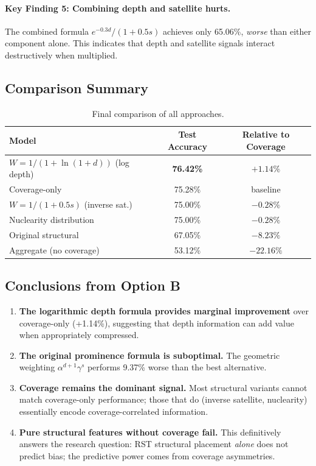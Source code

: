 \documentclass[12pt,a4paper]{article}
\begin{document}
\paragraph{Key Finding 5: Combining depth and satellite hurts.}
The combined formula $e^{-0.3d}/(1+0.5s)$ achieves only 65.06\%, \textit{worse} than either component alone.
This indicates that depth and satellite signals interact destructively when multiplied.

\subsection{Comparison Summary}

\begin{table}[h]
\centering
\begin{tabular}{lcc}
\hline
\textbf{Model} & \textbf{Test Accuracy} & \textbf{Relative to Coverage} \\
\hline
$W = 1/(1+\ln(1+d))$ (log depth) & \textbf{76.42\%} & $+1.14\%$ \\
Coverage-only & 75.28\% & baseline \\
$W = 1/(1+0.5s)$ (inverse sat.) & 75.00\% & $-0.28\%$ \\
Nuclearity distribution & 75.00\% & $-0.28\%$ \\
Original structural & 67.05\% & $-8.23\%$ \\
Aggregate (no coverage) & 53.12\% & $-22.16\%$ \\
\hline
\end{tabular}
\caption{Final comparison of all approaches.}
\label{tab:final_comparison}
\end{table}

\subsection{Conclusions from Option B}

\begin{enumerate}
\item \textbf{The logarithmic depth formula provides marginal improvement} over coverage-only (+1.14\%),
      suggesting that depth information can add value when appropriately compressed.

\item \textbf{The original prominence formula is suboptimal.}
      The geometric weighting $\alpha^{d+1}\gamma^s$ performs 9.37\% worse than the best alternative.

\item \textbf{Coverage remains the dominant signal.}
      Most structural variants cannot match coverage-only performance; those that do
      (inverse satellite, nuclearity) essentially encode coverage-correlated information.

\item \textbf{Pure structural features without coverage fail.}
      This definitively answers the research question: RST structural placement \textit{alone}
      does not predict bias; the predictive power comes from coverage asymmetries.
\end{enumerate}
\end{document}
